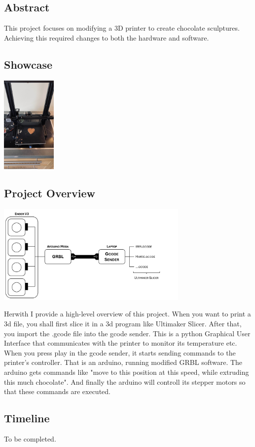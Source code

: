 \subsection{Abstract}

This project focuses on modifying a 3D printer to create chocolate sculptures.
Achieving this required changes to both the hardware and software.

\subsection{Showcase}

\begin{center}
    \includegraphics[width=0.2\textwidth]{introduction/hart.jpg}
\end{center}

\subsection{Project Overview}

\begin{center}
    \includegraphics[width=0.7\textwidth]{introduction/overview.png}
\end{center}

Herwith I provide a high-level overview of this project.
When you want to print a 3d file, you shall first slice it in a 3d program
like Ultimaker Slicer. After that, you import the .gcode file into the gcode sender.
This is a python Graphical User Interface that communicates with the printer to
monitor its temperature etc. When you press play in the gcode sender, it starts sending
commands to the printer's controller. That is an arduino, running modified GRBL software.
The arduino gets commands like "move to this position at this speed, while extruding this much
chocolate". And finally the arduino will controll its stepper motors so that these commands
are executed.

\newpage %

\subsection{Timeline}
To be completed.